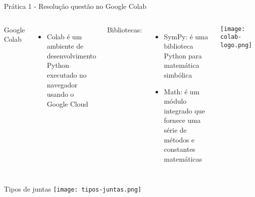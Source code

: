 \begin{frame}[c]{Prática 1 - Resolução questão no Google Colab}
    \begin{columns}
        Google Colab
        \begin{itemize} 
            \item Colab é um ambiente de desenvolvimento Python executado no 
            navegador usando o Google Cloud
        \end{itemize}
        \singlespacing
        Bibliotecas:
        \begin{itemize}
            \item SymPy: é uma biblioteca Python para matemática simbólica
            \item Math: é um módulo integrado que fornece uma série de métodos e constantes matemáticas
        \end{itemize}
            \centering
            \texttt{[image: colab-logo.png]}
    \end{columns}
\end{frame}

\begin{frame}[c]{Tipos de juntas}
    \centering
    \texttt{[image: tipos-juntas.png]}
\end{frame}

